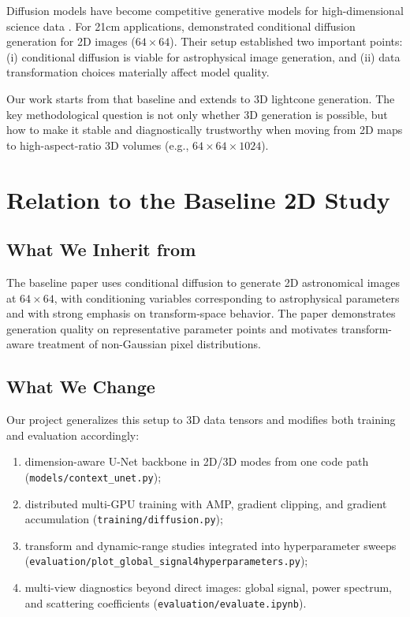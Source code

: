 \documentclass{aastex631}
\begin{document}
Diffusion models have become competitive generative models for high-dimensional science data \citep{ho2020denoising,dhariwal2021diffusion}. For 21cm applications, \citet{zhao2023can} demonstrated conditional diffusion generation for 2D images ($64\times64$). Their setup established two important points: (i) conditional diffusion is viable for astrophysical image generation, and (ii) data transformation choices materially affect model quality.

Our work starts from that baseline and extends to 3D lightcone generation. The key methodological question is not only whether 3D generation is possible, but how to make it stable and diagnostically trustworthy when moving from 2D maps to high-aspect-ratio 3D volumes (e.g., $64\times64\times1024$).

\section{Relation to the Baseline 2D Study}
\subsection{What We Inherit from \citet{zhao2023can}}
The baseline paper uses conditional diffusion to generate 2D astronomical images at $64\times64$, with conditioning variables corresponding to astrophysical parameters and with strong emphasis on transform-space behavior. The paper demonstrates generation quality on representative parameter points and motivates transform-aware treatment of non-Gaussian pixel distributions.

\subsection{What We Change}
Our project generalizes this setup to 3D data tensors and modifies both training and evaluation accordingly:
\begin{enumerate}
    \item dimension-aware U-Net backbone in 2D/3D modes from one code path (\texttt{models/context\_unet.py});
    \item distributed multi-GPU training with AMP, gradient clipping, and gradient accumulation (\texttt{training/diffusion.py});
    \item transform and dynamic-range studies integrated into hyperparameter sweeps (\texttt{evaluation/plot\_global\_signal4hyperparameters.py});
    \item multi-view diagnostics beyond direct images: global signal, power spectrum, and scattering coefficients (\texttt{evaluation/evaluate.ipynb}).
\end{enumerate}
\end{document}
